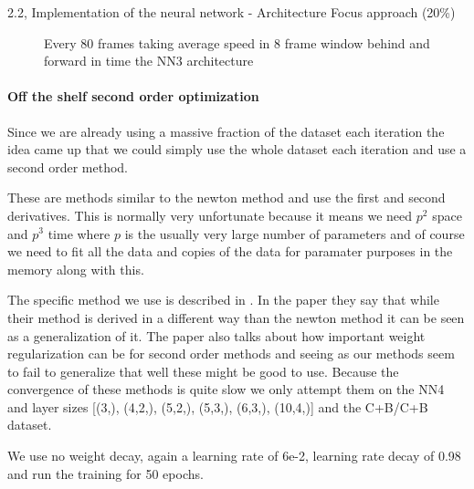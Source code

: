 \begin{task}{2.2, Implementation of the neural network - Architecture Focus approach (20\%)}
\begin{figure}
    \caption{Every 80 frames taking average speed in 8 frame window behind and forward in time the NN3 architecture}
    \label{fig:originalourdata}
\end{figure}

\paragraph{Off the shelf second order optimization}
Since we are already using a massive fraction of the dataset each iteration the idea came up that we could simply use the whole dataset each iteration and use a second order method.

These are methods similar to the newton method and use the first and second derivatives. This is normally very unfortunate because it means we need $p^2$ space and $p^3$ time where $p$ is the usually very large number of parameters and of course we need to fit all the data and copies of the data for paramater purposes in the memory along with this.

The specific method we use is described in \cite{martens2020optimizing}. In the paper they say that while their method is derived in a different way than the newton method it can be seen as a generalization of it. The paper also talks about how important weight regularization can be for second order methods and seeing as our methods seem to fail to generalize that well these might be good to use. Because the convergence of these methods is quite slow we only attempt them on the NN4 and layer sizes [(3,), (4,2,), (5,2,), (5,3,), (6,3,), (10,4,)] and the C+B/C+B dataset.

 We use no weight decay, again a learning rate of 6e-2, learning rate decay of 0.98 and run the training for 50 epochs.
 

\end{task}
